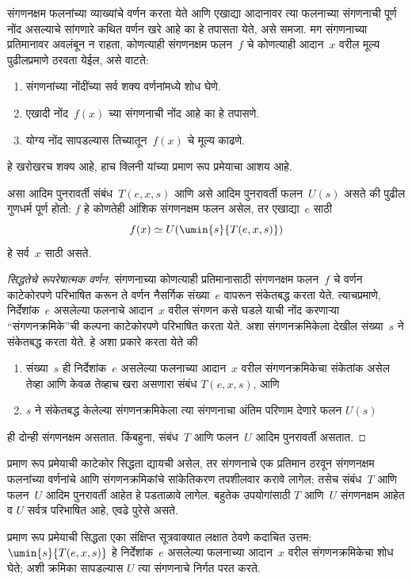 \documentclass[../../../include/open-logic-section]{subfiles}
\begin{document}

संगणनक्षम फलनांच्या व्याख्यांचे वर्णन करता येते आणि एखाद्या आदानावर
त्या फलनाच्या संगणनाची पूर्ण नोंद असल्याचे सांगणारे कथित वर्णन खरे आहे
का हे तपासता येते, असे समजा. मग संगणनाच्या प्रतिमानावर अवलंबून न राहता,
कोणत्याही संगणनक्षम फलन~$f$ चे कोणत्याही आदान~$x$ वरील मूल्य पुढीलप्रमाणे
ठरवता येईल, असे वाटते:
\begin{enumerate}
  \item संगणनांच्या नोंदींच्या सर्व शक्य वर्णनांमध्ये शोध घेणे.
  \item एखादी नोंद~$f(x)$ च्या संगणनाची नोंद आहे का हे तपासणे.
  \item योग्य नोंद सापडल्यास तिच्यातून~$f(x)$ चे मूल्य काढणे.
\end{enumerate}
हे खरोखरच शक्य आहे, हाच क्लिनी यांच्या प्रमाण रूप प्रमेयाचा आशय आहे.

\begin{thm}[क्लिनीचे प्रमाण रूप प्रमेय]
असा आदिम पुनरावर्ती संबंध~$T(e, x, s)$ आणि असे आदिम पुनरावर्ती
फलन~$U(s)$ असते की पुढील गुणधर्म पूर्ण होतो: $f$ हे कोणतेही
आंशिक संगणनक्षम फलन असेल, तर एखाद्या~$e$ साठी
\[
f(x) \simeq U(\umin{s}{T(e, x, s)})
\]
हे सर्व~$x$ साठी असते.
\end{thm}

\begin{proof}[सिद्धतेचे रूपरेषात्मक वर्णन]
संगणनाच्या कोणत्याही प्रतिमानासाठी संगणनक्षम फलन~$f$ चे वर्णन
काटेकोरपणे परिभाषित करून ते वर्णन नैसर्गिक संख्या~$e$ वापरून
संकेतबद्ध करता येते. त्याचप्रमाणे, निर्देशांक~$e$ असलेल्या फलनाचे
आदान~$x$ वरील संगणन कसे घडले याची नोंद करणाऱ्या ``संगणनक्रमिके''ची
कल्पना काटेकोरपणे परिभाषित करता येते. अशा संगणनक्रमिकेला देखील
संख्या~$s$ ने संकेतबद्ध करता येते. हे अशा प्रकारे करता येते की
\begin{enumerate}
  \item संख्या~$s$ ही निर्देशांक~$e$ असलेल्या फलनाच्या आदान~$x$
  वरील संगणनक्रमिकेचा संकेतांक असेल तेव्हा आणि केवळ तेव्हाच खरा असणारा संबंध
  $T(e, x, s)$, आणि
  \item $s$ ने संकेतबद्ध केलेल्या संगणनक्रमिकेला त्या संगणनाचा अंतिम
  परिणाम देणारे फलन $U(s)$
\end{enumerate}
ही दोन्ही संगणनक्षम असतात. किंबहुना, संबंध~$T$ आणि फलन~$U$
आदिम पुनरावर्ती असतात.
\end{proof}

\begin{explain}
प्रमाण रूप प्रमेयाची काटेकोर सिद्धता द्यायची असेल, तर संगणनाचे एक
प्रतिमान ठरवून संगणनक्षम फलनांच्या वर्णनांचे आणि संगणनक्रमिकांचे
सांकेतिकरण तपशीलवार करावे लागेल; तसेच संबंध~$T$ आणि फलन~$U$
आदिम पुनरावर्ती आहेत हे पडताळावे लागेल. बहुतेक उपयोगांसाठी $T$
आणि~$U$ संगणनक्षम आहेत व $U$ सर्वत्र परिभाषित आहे, एवढे पुरेसे असते.

प्रमाण रूप प्रमेयाची सिद्धता एका संक्षिप्त सूत्रवाक्यात लक्षात ठेवणे
कदाचित उत्तम: $\umin{s}{T(e, x, s)}$ हे निर्देशांक~$e$ असलेल्या
फलनाच्या आदान~$x$ वरील संगणनक्रमिकेचा शोध घेते; अशी क्रमिका
सापडल्यास $U$ त्या संगणनाचे निर्गत परत करते.
\end{explain}
\end{document}
